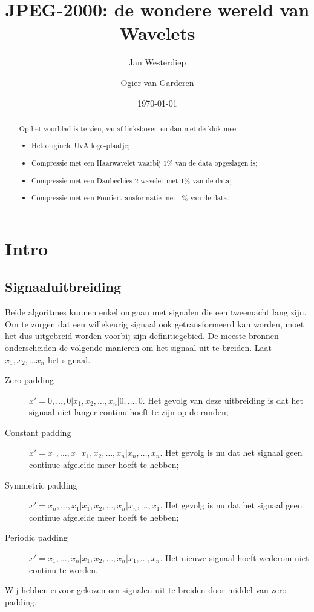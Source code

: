 \documentclass[11pt]{uvamath}
\title{JPEG-2000: de wondere wereld van Wavelets}
\date{\today}
\author[10219242, janner@gmail.com]{Jan Westerdiep}
\author[10191429, ovangarderen@gmail.com]{Ogier van Garderen}
\theoremstyle{plain}
\theoremstyle{definition}
\theoremstyle{remark}
\begin{document}
\maketitle

\begin{abstract}
\lipsum[2-3]

Op het voorblad is te zien, vanaf linksboven en dan met de klok mee:
\begin{itemize}
	\item Het originele UvA logo-plaatje;
	\item Compressie met een Haarwavelet waarbij 1\% van de data opgeslagen is;
	\item Compressie met een Daubechies-2 wavelet met 1\% van de data;
	\item Compressie met een Fouriertransformatie met 1\% van de data.
\end{itemize}
\end{abstract}

\tableofcontents
\newpage
\chapter{Intro}
\section{Signaaluitbreiding}
\label{signaal}
Beide algoritmes kunnen enkel omgaan met signalen die een tweemacht lang zijn. Om te zorgen dat een willekeurig signaal ook getransformeerd kan worden, moet het dus uitgebreid worden voorbij zijn definitiegebied. De meeste bronnen onderscheiden de volgende manieren om het signaal uit te breiden. Laat $x_1, x_2, \ldots x_n$ het signaal.
\begin{description}
\item[Zero-padding] $x' = 0, \ldots, 0| x_1, x_2, \ldots, x_n| 0, \ldots, 0$. Het gevolg van deze uitbreiding is dat het signaal niet langer continu hoeft te zijn op de randen;
\item[Constant padding] $x' = x_1, \ldots, x_1| x_1, x_2, \ldots, x_n| x_n, \ldots, x_n$. Het gevolg is nu dat het signaal geen continue afgeleide meer hoeft te hebben;
\item[Symmetric padding] $x' = x_n, \ldots, x_1| x_1, x_2, \ldots, x_n| x_n, \ldots, x_1$. Het gevolg is nu dat het signaal geen continue afgeleide meer hoeft te hebben;
\item[Periodic padding] $x' = x_1, \ldots, x_n| x_1, x_2, \ldots, x_n| x_1, \ldots, x_n$. Het nieuwe signaal hoeft wederom niet continu te worden.
\end{description}
Wij hebben ervoor gekozen om signalen uit te breiden door middel van zero-padding.
\end{document}
